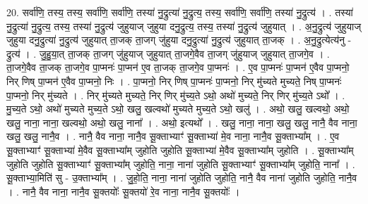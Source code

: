 \documentclass[17pt]{extarticle}
\begin{document}
20. सर्वा॑णि॒ तस्य॒ तस्य॒ सर्वा॑णि॒ सर्वा॑णि॒ तस्या॑ नु॒द्रुत्या॑ नु॒द्रुत्य॒ तस्य॒ सर्वा॑णि॒ सर्वा॑णि॒ तस्या॑ नु॒द्रुत्य॑ । . तस्या॑ नु॒द्रुत्या॑ नु॒द्रुत्य॒ तस्य॒ तस्या॑ नु॒द्रुत्य॑ जुहुयाज् जुहुया दनु॒द्रुत्य॒ तस्य॒ तस्या॑ नु॒द्रुत्य॑ जुहुयात् । . अ॒नु॒द्रुत्य॑ जुहुयाज् जुहुया दनु॒द्रुत्या॑ नु॒द्रुत्य॑ जुहुयात् ता॒जक् ता॒जग् जु॑हुया दनु॒द्रुत्या॑ नु॒द्रुत्य॑ जुहुयात् ता॒जक् । . अ॒नु॒द्रुत्येत्य॑नु - द्रुत्य॑ । . जु॒हु॒या॒त् ता॒जक् ता॒जग् जु॑हुयाज् जुहुयात् ता॒जगे॒वैव ता॒जग् जु॑हुयाज् जुहुयात् ता॒जगे॒व । . ता॒जगे॒वैव ता॒जक् ता॒जगे॒व पा॒प्मनः॑ पा॒प्मन॑ ए॒व ता॒जक् ता॒जगे॒व पा॒प्मनः॑ । . ए॒व पा॒प्मनः॑ पा॒प्मन॑ ए॒वैव पा॒प्मनो॒ निर् णिष् पा॒प्मन॑ ए॒वैव पा॒प्मनो॒ निः । . पा॒प्मनो॒ निर् णिष् पा॒प्मनः॑ पा॒प्मनो॒ निर् मु॑च्यते मुच्यते॒ निष् पा॒प्मनः॑ पा॒प्मनो॒ निर् मु॑च्यते । . निर् मु॑च्यते मुच्यते॒ निर् णिर् मु॑च्य॒ते ऽथो॒ अथो॑ मुच्यते॒ निर् णिर् मु॑च्य॒ते ऽथो᳚ । . मु॒च्य॒ते ऽथो॒ अथो॑ मुच्यते मुच्य॒ते ऽथो॒ खलु॒ खल्वथो॑ मुच्यते मुच्य॒ते ऽथो॒ खलु॑ । . अथो॒ खलु॒ खल्वथो॒ अथो॒ खलु॒ नाना॒ नाना॒ खल्वथो॒ अथो॒ खलु॒ नाना᳚ । . अथो॒ इत्यथो᳚ । . खलु॒ नाना॒ नाना॒ खलु॒ खलु॒ नानै॒ वैव नाना॒ खलु॒ खलु॒ नानै॒व । . नानै॒ वैव नाना॒ नानै॒व सू॒क्ताभ्याꣳ॑ सू॒क्ताभ्या॑ मे॒व नाना॒ नानै॒व सू॒क्ताभ्या᳚म् । . ए॒व सू॒क्ताभ्याꣳ॑ सू॒क्ताभ्या॑ मे॒वैव सू॒क्ताभ्या᳚म् जुहोति जुहोति सू॒क्ताभ्या॑ मे॒वैव सू॒क्ताभ्या᳚म् जुहोति । . सू॒क्ताभ्या᳚म् जुहोति जुहोति सू॒क्ताभ्याꣳ॑ सू॒क्ताभ्या᳚म् जुहोति॒ नाना॒ नाना॑ जुहोति सू॒क्ताभ्याꣳ॑ सू॒क्ताभ्या᳚म् जुहोति॒ नाना᳚ । . सू॒क्ताभ्या॒मिति॑ सु - उ॒क्ताभ्या᳚म् । . जु॒हो॒ति॒ नाना॒ नाना॑ जुहोति जुहोति॒ नानै॒ वैव नाना॑ जुहोति जुहोति॒ नानै॒व । . नानै॒ वैव नाना॒ नानै॒व सू॒क्तयोः᳚ सू॒क्तयो॑ रे॒व नाना॒ नानै॒व सू॒क्तयोः᳚ । \newline
\end{document}
